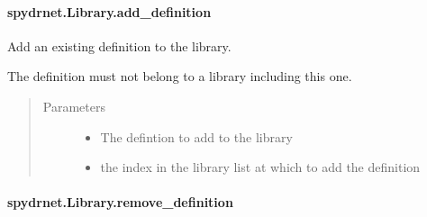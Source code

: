 \documentclass[letterpaper,10pt,english,openany,oneside]{sphinxmanual}
\begin{document}
\paragraph{spydrnet.Library.add\_definition}
\label{\detokenize{reference/classes/generated/spydrnet.Library.add_definition:spydrnet-library-add-definition}}\label{\detokenize{reference/classes/generated/spydrnet.Library.add_definition::doc}}

\begin{fulllineitems}
\label{\detokenize{reference/classes/generated/spydrnet.Library.add_definition:spydrnet.Library.add_definition}}
Add an existing definition to the library.

The definition must not belong to a library including this one.
\begin{quote}\begin{description}
\item[{Parameters}] \leavevmode\begin{itemize}
\item {} 
 \textendash{} The defintion to add to the library

\item {} 
 \textendash{} the index in the library list at which to add the definition

\end{itemize}

\end{description}\end{quote}

\end{fulllineitems}



\paragraph{spydrnet.Library.remove\_definition}
\label{\detokenize{reference/classes/generated/spydrnet.Library.remove_definition:spydrnet-library-remove-definition}}\label{\detokenize{reference/classes/generated/spydrnet.Library.remove_definition::doc}}
\end{document}
